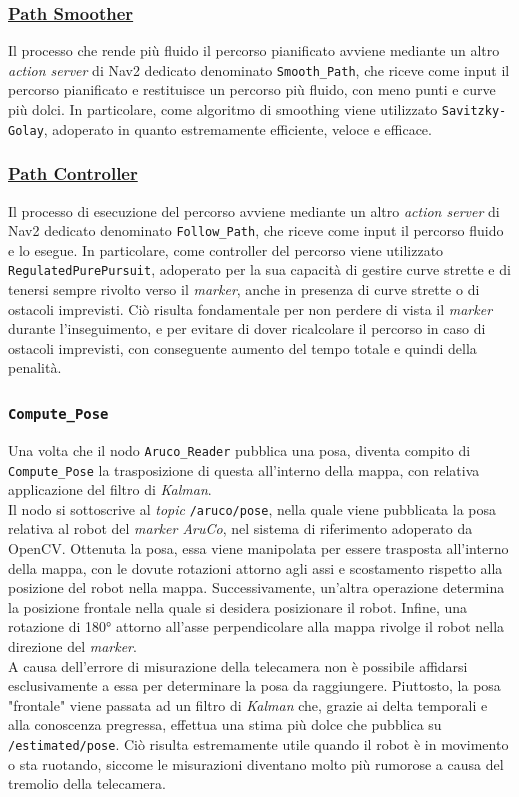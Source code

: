 \documentclass[12pt]{article}
\begin{document}
\subsubsection{\href{https://docs.nav2.org/configuration/packages/configuring-savitzky-golay-smoother.html}{Path Smoother}}
Il processo che rende più fluido il percorso pianificato avviene mediante un altro \textit{action server} di Nav2 dedicato denominato \texttt{Smooth\_Path}, che riceve come input il percorso pianificato e restituisce un percorso più fluido, con meno punti e curve più dolci. In particolare, come algoritmo di smoothing viene utilizzato \texttt{Savitzky-Golay}, adoperato in quanto estremamente efficiente, veloce e efficace.
\subsubsection{\href{https://docs.nav2.org/configuration/packages/configuring-regulated-pp.html}{Path Controller}}
Il processo di esecuzione del percorso avviene mediante un altro \textit{action server} di Nav2 dedicato denominato \texttt{Follow\_Path}, che riceve come input il percorso fluido e lo esegue. In particolare, come controller del percorso viene utilizzato \texttt{RegulatedPurePursuit}, adoperato per la sua capacità di gestire curve strette e di tenersi sempre rivolto verso il \textit{marker}, anche in presenza di curve strette o di ostacoli imprevisti. Ciò risulta fondamentale per non perdere di vista il \textit{marker} durante l'inseguimento, e per evitare di dover ricalcolare il percorso in caso di ostacoli imprevisti, con conseguente aumento del tempo totale e quindi della penalità.
\subsubsection{\texttt{Compute\_Pose}}
Una volta che il nodo \texttt{Aruco\_Reader} pubblica una posa, diventa compito di \texttt{Compute\_Pose} la trasposizione di questa all'interno della mappa, con relativa applicazione del filtro di \textit{Kalman}.
\\[1em]
Il nodo si sottoscrive al \textit{topic} \texttt{/aruco/pose}, nella quale viene pubblicata la posa relativa al robot del \textit{marker AruCo}, nel sistema di riferimento adoperato da OpenCV. Ottenuta la posa, essa viene manipolata per essere trasposta all'interno della mappa, con le dovute rotazioni attorno agli assi e scostamento rispetto alla posizione del robot nella mappa. Successivamente, un'altra operazione determina la posizione frontale nella quale si desidera posizionare il robot. Infine, una rotazione di 180° attorno all'asse perpendicolare alla mappa rivolge il robot nella direzione del \textit{marker}.
\\[1em]
A causa dell'errore di misurazione della telecamera non è possibile affidarsi esclusivamente a essa per determinare la posa da raggiungere. Piuttosto, la posa "frontale" viene passata ad un filtro di \textit{Kalman} che, grazie ai delta temporali e alla conoscenza pregressa, effettua una stima più dolce che pubblica su \texttt{/estimated/pose}. Ciò risulta estremamente utile quando il robot è in movimento o sta ruotando, siccome le misurazioni diventano molto più rumorose a causa del tremolio della telecamera.
\end{document}

